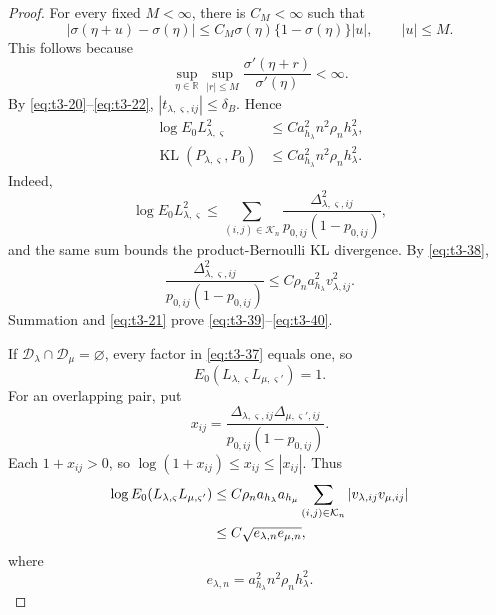 \documentclass[10pt,a4paper]{amsart}
\begin{document}
\begin{proof}
For every fixed \(M<\infty\), there is \(C_M<\infty\) such that
\begin{equation}
|\sigma(\eta+u)-\sigma(\eta)|
\le
C_M\sigma(\eta)\{1-\sigma(\eta)\}|u|,
\qquad |u|\le M.
\label{eq:t3-38}
\end{equation}
This follows because
\[
\sup_{\eta\in\mathbb R}
\sup_{|r|\le M}
\frac{\sigma'(\eta+r)}{\sigma'(\eta)}
<\infty.
\]
By \eqref{eq:t3-20}--\eqref{eq:t3-22},
\(|t_{\lambda,\varsigma,ij}|\le\delta_B\).  Hence
\begin{align}
\log E_0L_{\lambda,\varsigma}^2
&\le
C a_{h_\lambda}^2n^2\rho_nh_\lambda^2,
\label{eq:t3-39}\\
\operatorname{KL}(P_{\lambda,\varsigma},P_0)
&\le
C a_{h_\lambda}^2n^2\rho_nh_\lambda^2.
\label{eq:t3-40}
\end{align}
Indeed,
\[
\log E_0L_{\lambda,\varsigma}^2
\le
\sum_{(i,j)\in\mathcal K_n}
\frac{\Delta_{\lambda,\varsigma,ij}^2}
{p_{0,ij}(1-p_{0,ij})},
\]
and the same sum bounds the product-Bernoulli KL divergence.  By
\eqref{eq:t3-38},
\[
\frac{\Delta_{\lambda,\varsigma,ij}^2}
{p_{0,ij}(1-p_{0,ij})}
\le
C\rho_n a_{h_\lambda}^2v_{\lambda,ij}^2.
\]
Summation and \eqref{eq:t3-21} prove
\eqref{eq:t3-39}--\eqref{eq:t3-40}.

If
\(\mathcal D_\lambda\cap\mathcal D_\mu=\varnothing\), every factor in
\eqref{eq:t3-37} equals one, so
\begin{equation}
E_0
(L_{\lambda,\varsigma}L_{\mu,\varsigma'})
=1.
\label{eq:t3-41}
\end{equation}
For an overlapping pair, put
\[
x_{ij}
=
\frac{
\Delta_{\lambda,\varsigma,ij}
\Delta_{\mu,\varsigma',ij}
}{
p_{0,ij}(1-p_{0,ij})
}.
\]
Each \(1+x_{ij}>0\), so
\(\log(1+x_{ij})\le x_{ij}\le|x_{ij}|\).  Thus
\begin{align}
\log E_0
(L_{\lambda,\varsigma}L_{\mu,\varsigma'})
&\le
C\rho_n a_{h_\lambda}a_{h_\mu}
\sum_{(i,j)\in\mathcal K_n}
|v_{\lambda,ij}v_{\mu,ij}|
\notag\\
&\le
C\sqrt{e_{\lambda,n}e_{\mu,n}},
\label{eq:t3-42}
\end{align}
where
\[
e_{\lambda,n}
=
a_{h_\lambda}^2n^2\rho_nh_\lambda^2.
\]


\end{proof}
\end{document}
